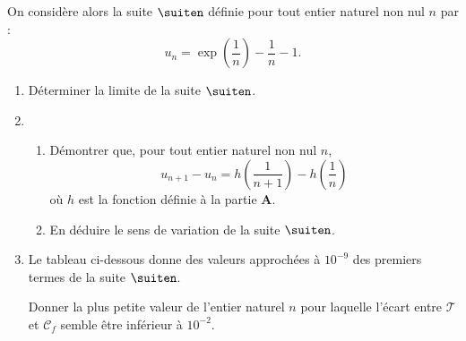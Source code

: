 On considère alors la suite $\suiten$ définie pour tout entier naturel non nul $n$ par : \[ u_n  = \exp\left(\dfrac{1}{n}\right)-\dfrac{1}{n}-1.\]
%
\begin{enumerate}[resume]
	\item Déterminer la limite de la suite $\suiten$.
	\item 
	\begin{enumerate}
		\item Démontrer que, pour tout entier naturel non nul $n$, \[ u_{n+1}-u_n = h \left( \dfrac{1}{n+1}\right) - h\left( \dfrac{1}{n}\right) \]%
		où $h$ est la fonction définie à la partie \textbf{A}.
		\item En déduire le sens de variation de la suite $\suiten$.
	\end{enumerate}
	\item Le tableau ci-dessous donne des valeurs approchées à $10^{-9}$ des premiers termes de la suite $\suiten$.
	
	\begin{center}
	\end{center}
	Donner la plus petite valeur de l’entier naturel $n$ pour laquelle l’écart entre $\mathcal{T}$ et $\mathcal{C}_f$ semble être inférieur à $10^{-2}$.
\end{enumerate}

